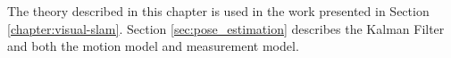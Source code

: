 \begin{comment}
\paragraph{Particle Filter}
The key idea of the \textit{Particle Filter}  is to represent the posterior $bel(x_t)$ by a set of random state particles (samples) drawn from this posterior.
This representation is approximate, but can represent a much broader space of discributions than the single-hypothesis trackers.
Another advantage is that the transformations are not limited to linear functions anymore.

The particles (samples) are denoted
\begin{equation}
\chi = x_t^{[1]}, x_t^{[2]}, \hdots, x_t^{[M]}
\end{equation}
Each particle $x_t^{[m]}$ is a state hypothesis at time $t$.
Ideally, the likelihood for a state hypothesis $x_t$ to be in $\chi$, should be proportional to $bel(x_t)$.
The denser a subregion of the space is populated with particles, the more likely it is that the true state falls into this region.
In the prediction step, the motion model is applied to each particle $x_{t-1}^{[m]}$ to generate a prediction $x_t^{[m]}$.
When observation $z_t$ is made, the \textit{importance factor} $w_t^{[m]}$ is computed.
\begin{equation}
w_t^{[m]} = p ( z_t | x_t^{[m]}, z_{0 \to t-1})
\end{equation}
The final step of the particle filter is {resampling}, in which the current set of particles re-sampled based on the computed likelihoods.
The algorithm draws with replacement $M$ particles from the temporary set $\overline{\chi}_t$.
The probability of each particle is given by its importance weights.
This changes the distribution of the particle from $\overline{bel}(x_t)$ to $bel(x_t)$.

Particle filters overcome the limitations of using a Gaussian to represent a probability distribution.
With sufficient samples, they approach the Bayesian optimal estimate, so they can be made more accurate than either the EKF or UKF.
The increased representational power of particle filters comes at the cost of higher computational complexity.
And, when the number of particles is insufficient, the particle filter might suffer from sample impoverishment.
\end{comment}

The theory described in this chapter is used in the work presented in Section \ref{chapter:visual-slam}.
Section \ref{sec:pose_estimation} describes the Kalman Filter and both the motion model and measurement model.